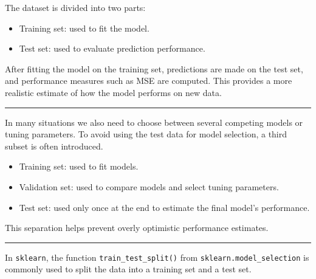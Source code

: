 \documentclass[
  letterpaper,
  DIV=11,
  numbers=noendperiod]{scrreprt}
\providecommand{\tightlist}{%
  \setlength{\itemsep}{0pt}\setlength{\parskip}{0pt}}
\theoremstyle{definition}
\theoremstyle{definition}
\theoremstyle{plain}
\theoremstyle{plain}
\theoremstyle{remark}
\begin{document}
The dataset is divided into two parts:

\begin{itemize}
\tightlist
\item
  Training set: used to fit the model.
\item
  Test set: used to evaluate prediction performance.
\end{itemize}

After fitting the model on the training set, predictions are made on the
test set, and performance measures such as MSE are computed. This
provides a more realistic estimate of how the model performs on new
data.

\begin{center}\rule{0.5\linewidth}{0.5pt}\end{center}

In many situations we also need to choose between several competing
models or tuning parameters. To avoid using the test data for model
selection, a third subset is often introduced.

\begin{itemize}
\tightlist
\item
  Training set: used to fit models.
\item
  Validation set: used to compare models and select tuning parameters.
\item
  Test set: used only once at the end to estimate the final model's
  performance.
\end{itemize}

This separation helps prevent overly optimistic performance estimates.

\begin{center}\rule{0.5\linewidth}{0.5pt}\end{center}

In \texttt{sklearn}, the function \texttt{train\_test\_split()} from
\texttt{sklearn.model\_selection} is commonly used to split the data
into a training set and a test set.
\end{document}
